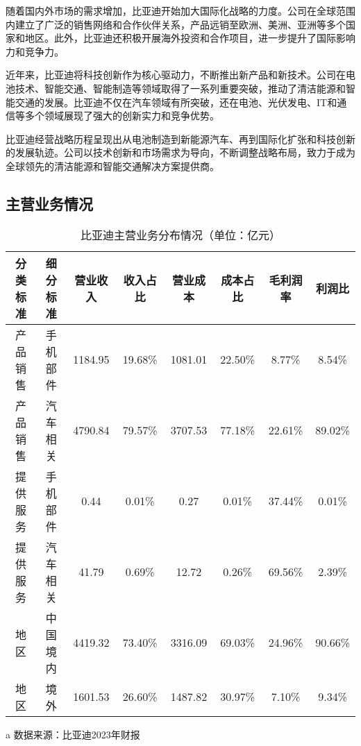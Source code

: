 随着国内外市场的需求增加，比亚迪开始加大国际化战略的力度。公司在全球范围内建立了广泛的销售网络和合作伙伴关系，产品远销至欧洲、美洲、亚洲等多个国家和地区。此外，比亚迪还积极开展海外投资和合作项目，进一步提升了国际影响力和竞争力。

近年来，比亚迪将科技创新作为核心驱动力，不断推出新产品和新技术。公司在电池技术、智能交通、智能制造等领域取得了一系列重要突破，推动了清洁能源和智能交通的发展。比亚迪不仅在汽车领域有所突破，还在电池、光伏发电、IT和通信等多个领域展现了强大的创新实力和竞争优势。

比亚迪经营战略历程呈现出从电池制造到新能源汽车、再到国际化扩张和科技创新的发展轨迹。公司以技术创新和市场需求为导向，不断调整战略布局，致力于成为全球领先的清洁能源和智能交通解决方案提供商。
\subsection{主营业务情况}
\begin{table}
  \centering
  \begin{threeparttable}[c]
    \caption{比亚迪主营业务分布情况（单位：亿元）}
    \label{tab:main-income}
    \begin{tabular}{cccccccc}
      \toprule
        分类标准 & 细分标准 & 营业收入 & 收入占比 & 营业成本 & 成本占比 & 毛利润率  & 利润比 \\ 
      \midrule
        产品销售 & 手机部件 & 1184.95  & 19.68\% & 1081.01  & 22.50\% & 8.77\% & 8.54\% \\ 
        产品销售 & 汽车相关 & 4790.84  & 79.57\% & 3707.53  & 77.18\% & 22.61\% & 89.02\% \\ 
        提供服务 & 手机部件 & 0.44  & 0.01\% & 0.27  & 0.01\% & 37.44\% & 0.01\% \\ 
        提供服务 & 汽车相关 & 41.79  & 0.69\% & 12.72  & 0.26\% & 69.56\% & 2.39\% \\ 
        地区 & 中国境内 & 4419.32  & 73.40\% & 3316.09  & 69.03\% & 24.96\% & 90.66\% \\ 
        地区 & 境外 & 1601.53  & 26.60\% & 1487.82  & 30.97\% & 7.10\% & 9.34\% \\ 
      \bottomrule
    \end{tabular}
    \begin{tablenotes}
      \item [a] 数据来源：比亚迪2023年财报
    \end{tablenotes}
  \end{threeparttable}
\end{table}

